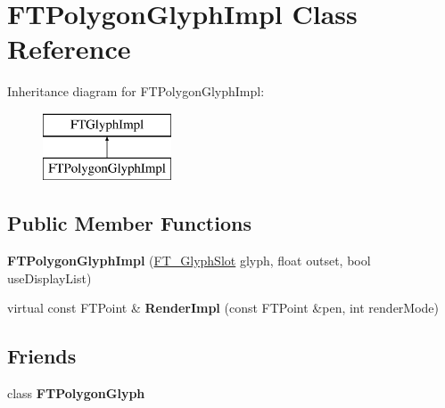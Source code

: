\hypertarget{class_f_t_polygon_glyph_impl}{}\section{F\+T\+Polygon\+Glyph\+Impl Class Reference}
\label{class_f_t_polygon_glyph_impl}
Inheritance diagram for F\+T\+Polygon\+Glyph\+Impl\+:\begin{figure}[H]
\begin{center}
\leavevmode
\includegraphics[height=2.000000cm]{class_f_t_polygon_glyph_impl}
\end{center}
\end{figure}
\subsection*{Public Member Functions}
\begin{DoxyCompactItemize}
\item 
{\bfseries F\+T\+Polygon\+Glyph\+Impl} (\hyperlink{struct_f_t___glyph_slot_rec__}{F\+T\+\_\+\+Glyph\+Slot} glyph, float outset, bool use\+Display\+List)\hypertarget{class_f_t_polygon_glyph_impl_ab302277a0e76adf9570f1ef9f9ae851f}{}\label{class_f_t_polygon_glyph_impl_ab302277a0e76adf9570f1ef9f9ae851f}

\item 
virtual const F\+T\+Point \& {\bfseries Render\+Impl} (const F\+T\+Point \&pen, int render\+Mode)\hypertarget{class_f_t_polygon_glyph_impl_af689ff9cecc738d292d494bf83adca39}{}\label{class_f_t_polygon_glyph_impl_af689ff9cecc738d292d494bf83adca39}

\end{DoxyCompactItemize}
\subsection*{Friends}
\begin{DoxyCompactItemize}
\item 
class {\bfseries F\+T\+Polygon\+Glyph}\hypertarget{class_f_t_polygon_glyph_impl_a0e33f7bc34e1097f8f9adcb6252d1bc0}{}\label{class_f_t_polygon_glyph_impl_a0e33f7bc34e1097f8f9adcb6252d1bc0}

\end{DoxyCompactItemize}
